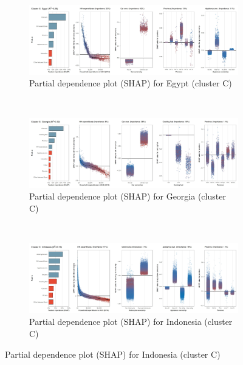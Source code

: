 \begin{figure}[ht!]\ContinuedFloat
    \centering
   \begin{subfigure}[b]{\textwidth}
    \centering
         \caption{Partial dependence plot (SHAP) for Egypt (cluster C)}
         \label{fig:5b_EGY}
         \includegraphics[width=\textwidth]{Figure 5b/Figure_5b_EGY}    
   \end{subfigure}
    \\
    \vspace{0.5cm}
   \begin{subfigure}[b]{\textwidth}
   \centering
         \caption{Partial dependence plot (SHAP) for Georgia (cluster C)}
         \label{fig:5b_GEO}
         \includegraphics[width=\textwidth]{Figure 5b/Figure_5b_GEO}    
   \end{subfigure}
    \\
    \vspace{0.5cm}
   \begin{subfigure}[b]{\textwidth} 
   \centering
         \caption{Partial dependence plot (SHAP) for Indonesia (cluster C)}
         \label{fig:5b_IDN}
         \includegraphics[width=\textwidth]{Figure 5b/Figure_5b_IDN}
    \end{subfigure}

\end{figure}

